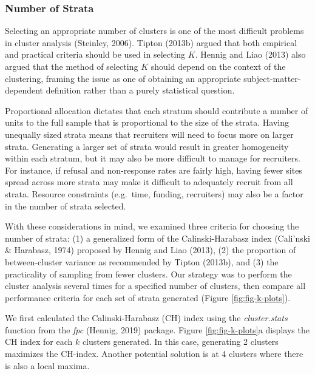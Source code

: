 \documentclass[
  english,
  man,floatsintext]{apa6}
\begin{document}
\hypertarget{number-of-strata}{%
\subsubsection{Number of Strata}\label{number-of-strata}}

Selecting an appropriate number of clusters is one of the most difficult problems in cluster analysis (Steinley, 2006). Tipton (2013b) argued that both empirical and practical criteria should be used in selecting \(K\). Hennig and Liao (2013) also argued that the method of selecting \(K\) should depend on the context of the clustering, framing the issue as one of obtaining an appropriate subject-matter-dependent definition rather than a purely statistical question.

Proportional allocation dictates that each stratum should contribute a number of units to the full sample that is proportional to the size of the strata. Having unequally sized strata means that recruiters will need to focus more on larger strata. Generating a larger set of strata would result in greater homogeneity within each stratum, but it may also be more difficult to manage for recruiters. For instance, if refusal and non-response rates are fairly high, having fewer sites spread across more strata may make it difficult to adequately recruit from all strata. Resource constraints (e.g.~time, funding, recruiters) may also be a factor in the number of strata selected.

With these considerations in mind, we examined three criteria for choosing the number of strata: (1) a generalized form of the Calinski-Harabasz index (Cali'nski \& Harabasz, 1974) proposed by Hennig and Liao (2013), (2) the proportion of between-cluster variance as recommended by Tipton (2013b), and (3) the practicality of sampling from fewer clusters. Our strategy was to perform the cluster analysis several times for a specified number of clusters, then compare all performance criteria for each set of strata generated (Figure \ref{fig:fig-k-plots}).

We first calculated the Calinski-Harabasz (CH) index using the \emph{cluster.stats} function from the \emph{fpc} (Hennig, 2019) package. Figure \ref{fig:fig-k-plots}a displays the CH index for each \(k\) clusters generated. In this case, generating 2 clusters maximizes the CH-index. Another potential solution is at 4 clusters where there is also a local maxima.
\end{document}
